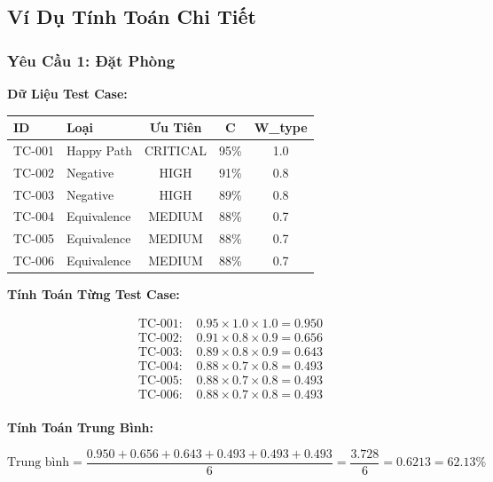 \documentclass[12pt, a4paper]{article}
\begin{document}
\subsection{Ví Dụ Tính Toán Chi Tiết}

\subsubsection{Yêu Cầu 1: Đặt Phòng}

\textbf{Dữ Liệu Test Case:}

\begin{table}[h]
\centering
\begin{tabular}{|l|l|c|c|c|}
\hline
\textbf{ID} & \textbf{Loại} & \textbf{Ưu Tiên} & \textbf{C} & \textbf{W\_type} \\
\hline
TC-001 & Happy Path & CRITICAL & 95\% & 1.0 \\
TC-002 & Negative & HIGH & 91\% & 0.8 \\
TC-003 & Negative & HIGH & 89\% & 0.8 \\
TC-004 & Equivalence & MEDIUM & 88\% & 0.7 \\
TC-005 & Equivalence & MEDIUM & 88\% & 0.7 \\
TC-006 & Equivalence & MEDIUM & 88\% & 0.7 \\
\hline
\end{tabular}
\end{table}

\textbf{Tính Toán Từng Test Case:}

\begin{align}
\text{TC-001: } &0.95 \times 1.0 \times 1.0 = 0.950 \\
\text{TC-002: } &0.91 \times 0.8 \times 0.9 = 0.656 \\
\text{TC-003: } &0.89 \times 0.8 \times 0.9 = 0.643 \\
\text{TC-004: } &0.88 \times 0.7 \times 0.8 = 0.493 \\
\text{TC-005: } &0.88 \times 0.7 \times 0.8 = 0.493 \\
\text{TC-006: } &0.88 \times 0.7 \times 0.8 = 0.493 \\
\end{align}

\textbf{Tính Toán Trung Bình:}

\begin{equation}
\text{Trung bình} = \frac{0.950 + 0.656 + 0.643 + 0.493 + 0.493 + 0.493}{6} = \frac{3.728}{6} = 0.6213 = 62.13\%
\end{equation}
\end{document}
